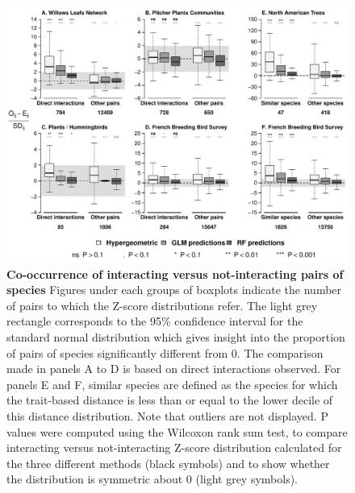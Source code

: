 \begin{figure}
\centering
\includegraphics{chapitre3/figIntVsNoint.pdf}
\caption{\textbf{Co-occurrence of interacting versus not-interacting
pairs of species} Figures under each groups of boxplots indicate the
number of pairs to which the Z-score distributions refer. The light grey
rectangle corresponds to the 95\% confidence interval for the standard
normal distribution which gives insight into the proportion of pairs of
species significantly different from 0. The comparison made in panels A
to D is based on direct interactions observed. For panels E and F,
similar species are defined as the species for which the trait-based
distance is less than or equal to the lower decile of this distance
distribution. Note that outliers are not displayed. P values were
computed using the Wilcoxon rank sum test, to compare interacting versus
not-interacting Z-score distribution calculated for the three different
methods (black symbols) and to show whether the distribution is
symmetric about 0 (light grey symbols).\label{fig:synth}}
\end{figure}

\newpage

